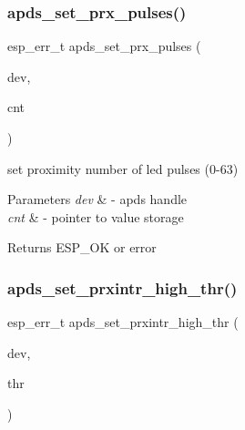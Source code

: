 \subsubsection{\texorpdfstring{apds\+\_\+set\+\_\+prx\+\_\+pulses()}{apds\_set\_prx\_pulses()}}
{\footnotesize\ttfamily esp\+\_\+err\+\_\+t apds\+\_\+set\+\_\+prx\+\_\+pulses (\begin{DoxyParamCaption}\item[{\hyperlink{structAPDS9960__Driver}{A\+P\+D\+S\+\_\+\+D\+EV}}]{dev,  }\item[{\hyperlink{vl53l0x__types_8h_aba7bc1797add20fe3efdf37ced1182c5}{uint8\+\_\+t} $\ast$}]{cnt }\end{DoxyParamCaption})}




\begin{DoxyItemize}
\item set proximity number of led pulses (0-\/63) 
\end{DoxyItemize}


\begin{DoxyParams}{Parameters}
{\em dev} & -\/ apds handle \\
\hline
{\em cnt} & -\/ pointer to value storage \\
\hline
\end{DoxyParams}
\begin{DoxyReturn}{Returns}
E\+S\+P\+\_\+\+OK or error 
\end{DoxyReturn}
\mbox{\label{group__APDS9960__ProximityFunctions_ga6157c022a79a16d29b22baebd03e6e49}} 
\subsubsection{\texorpdfstring{apds\+\_\+set\+\_\+prxintr\+\_\+high\+\_\+thr()}{apds\_set\_prxintr\_high\_thr()}}
{\footnotesize\ttfamily esp\+\_\+err\+\_\+t apds\+\_\+set\+\_\+prxintr\+\_\+high\+\_\+thr (\begin{DoxyParamCaption}\item[{\hyperlink{structAPDS9960__Driver}{A\+P\+D\+S\+\_\+\+D\+EV}}]{dev,  }\item[{\hyperlink{vl53l0x__types_8h_aba7bc1797add20fe3efdf37ced1182c5}{uint8\+\_\+t} $\ast$}]{thr }\end{DoxyParamCaption})}




